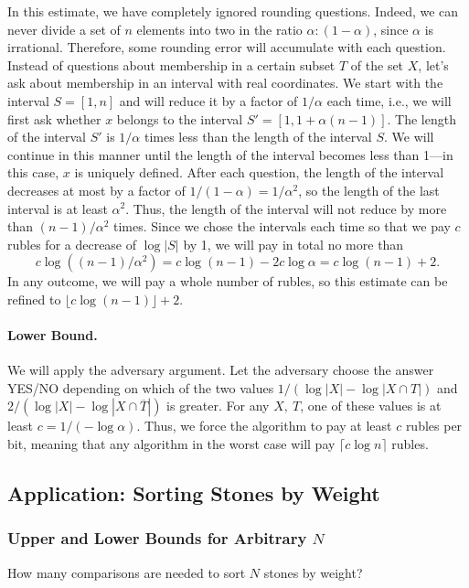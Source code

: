 \documentclass[12pt,sans]{article}
\theoremstyle{definition}
\theoremstyle{plain}
\theoremstyle{remark}
\begin{document}
In this estimate, we have completely ignored rounding questions. Indeed, we can never divide a set of \(n\) elements into two in the ratio \(\alpha:(1-\alpha)\), since \(\alpha\) is irrational. Therefore, some rounding error will accumulate with each question. Instead of questions about membership in a certain subset \(T\) of the set \(X\), let's ask about membership in an interval with real coordinates. We start with the interval \(S = [1,n]\) and will reduce it by a factor of \(1/\alpha\) each time, i.e., we will first ask whether \(x\) belongs to the interval \(S' = [1, 1 + \alpha(n-1)]\). The length of the interval \(S'\) is \(1/\alpha\) times less than the length of the interval \(S\). We will continue in this manner until the length of the interval becomes less than 1—in this case, \(x\) is uniquely defined. After each question, the length of the interval decreases at most by a factor of \(1/(1 - \alpha) = 1/\alpha^2\), so the length of the last interval is at least \(\alpha^2\). Thus, the length of the interval will not reduce by more than \((n-1)/\alpha^2\) times. Since we chose the intervals each time so that we pay \(c\) rubles for a decrease of \(\log |S|\) by 1, we will pay in total no more than
\[
c\log((n-1)/\alpha^2) = c\log(n-1) - 2c\log \alpha = c\log(n-1) + 2.
\]
In any outcome, we will pay a whole number of rubles, so this estimate can be refined to \(\lfloor c\log(n-1)\rfloor + 2\).

\paragraph{Lower Bound.} We will apply the adversary argument. Let the adversary
choose the answer YES/NO depending on which of the two values \(1/(\log |X| - \log|X \cap T|)\) and \(2/(\log |X| -
\log|X \cap \overline T|)\) is greater. For any \(X,\ T\), one of these values is at least \(c = 1/(-\log\alpha)\). Thus,
we force the algorithm to pay at least \(c\) rubles per bit, meaning that any algorithm in the worst case will pay
\(\lceil c\log n\rceil\) rubles.

\subsection{Application: Sorting Stones by Weight}
\subsubsection{Upper and Lower Bounds for Arbitrary \(N\)}
How many comparisons are needed to sort \(N\) stones by weight?
\end{document}
